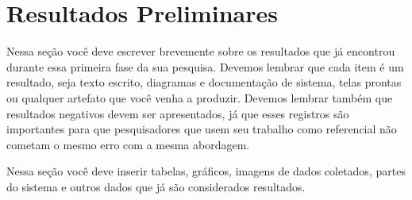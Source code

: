 \chapter{Resultados Preliminares} \label{cap:05}



Nessa seção você deve escrever brevemente sobre os resultados que já encontrou durante essa primeira fase da sua pesquisa.
Devemos lembrar que cada item é um resultado, seja texto escrito, diagramas e documentação de sistema, telas prontas ou qualquer artefato que você venha a produzir. Devemos lembrar também que resultados negativos devem ser apresentados, já que esses registros são importantes para que pesquisadores que usem seu trabalho como referencial não cometam o mesmo erro com a mesma abordagem.

Nessa seção você deve inserir tabelas, gráficos, imagens de dados coletados, partes do sistema e outros dados que já são considerados resultados. 


